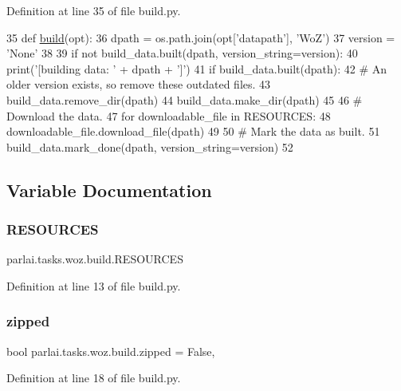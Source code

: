 Definition at line 35 of file build.\+py.


\begin{DoxyCode}
35 \textcolor{keyword}{def }\hyperlink{namespacedialog__babi__feedback_1_1build_a7a9d289f7493a5ded13c4b7f071b6184}{build}(opt):
36     dpath = os.path.join(opt[\textcolor{stringliteral}{'datapath'}], \textcolor{stringliteral}{'WoZ'})
37     version = \textcolor{stringliteral}{'None'}
38 
39     \textcolor{keywordflow}{if} \textcolor{keywordflow}{not} build\_data.built(dpath, version\_string=version):
40         print(\textcolor{stringliteral}{'[building data: '} + dpath + \textcolor{stringliteral}{']'})
41         \textcolor{keywordflow}{if} build\_data.built(dpath):
42             \textcolor{comment}{# An older version exists, so remove these outdated files.}
43             build\_data.remove\_dir(dpath)
44         build\_data.make\_dir(dpath)
45 
46         \textcolor{comment}{# Download the data.}
47         \textcolor{keywordflow}{for} downloadable\_file \textcolor{keywordflow}{in} RESOURCES:
48             downloadable\_file.download\_file(dpath)
49 
50     \textcolor{comment}{# Mark the data as built.}
51     build\_data.mark\_done(dpath, version\_string=version)
52 \end{DoxyCode}


\subsection{Variable Documentation}
\mbox{\label{namespaceparlai_1_1tasks_1_1woz_1_1build_a5cef39ffd42686f4cc8c6a5e5fa120e2}} 
\subsubsection{\texorpdfstring{R\+E\+S\+O\+U\+R\+C\+ES}{RESOURCES}}
{\footnotesize\ttfamily parlai.\+tasks.\+woz.\+build.\+R\+E\+S\+O\+U\+R\+C\+ES}



Definition at line 13 of file build.\+py.

\mbox{\label{namespaceparlai_1_1tasks_1_1woz_1_1build_a8c08fd88da87be20522e5e4f4c6b82ec}} 
\subsubsection{\texorpdfstring{zipped}{zipped}}
{\footnotesize\ttfamily bool parlai.\+tasks.\+woz.\+build.\+zipped = False,}



Definition at line 18 of file build.\+py.

